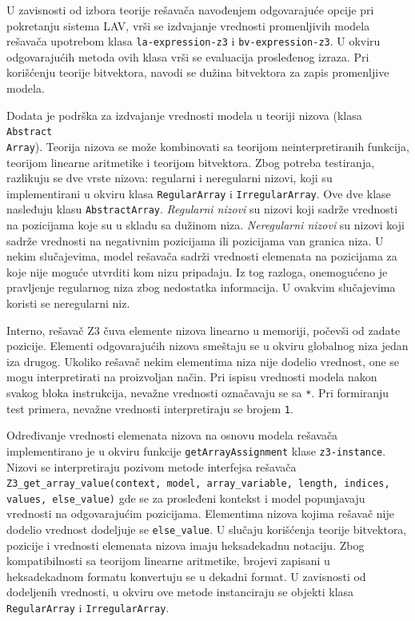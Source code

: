 \documentclass[12pt,oneside]{memoir}
\begin{document}
\par
U zavisnosti od izbora teorije rešavača navođenjem odgovarajuće opcije pri pokretanju sistema LAV, vrši se izdvajanje vrednosti promenljivih modela rešavača upotrebom klasa \texttt{la-expression-z3} i \texttt{bv-expression-z3}. U okviru odgovarajućih metoda ovih klasa vrši se evaluacija prosleđenog izraza. Pri korišćenju teorije bitvektora, navodi se dužina bitvektora za zapis promenljive modela.


Dodata je podrška za izdvajanje vrednosti modela u teoriji nizova (klasa \texttt{Abstract\\Array}). Teorija nizova se može kombinovati sa teorijom neinterpretiranih funkcija, teorijom linearne aritmetike i teorijom bitvektora.
Zbog potreba testiranja, razlikuju se dve vrste nizova: regularni i neregularni nizovi, koji su implementirani u okviru klasa \texttt{RegularArray} i \texttt{IrregularArray}. Ove dve klase nasleđuju klasu \texttt{AbstractArray}. \emph{Regularni nizovi} su nizovi koji sadrže vrednosti na pozicijama koje su u skladu sa dužinom niza. \emph{Neregularni nizovi} su nizovi koji sadrže vrednosti na negativnim pozicijama ili pozicijama van granica niza. U nekim slučajevima, model rešavača sadrži vrednosti elemenata na pozicijama za koje nije moguće utvrditi kom nizu pripadaju. Iz tog razloga, onemogućeno je pravljenje regularnog niza zbog nedostatka informacija. U ovakvim slučajevima koristi se neregularni niz.
\par
Interno, rešavač Z3 čuva elemente nizova linearno u memoriji, počevši od zadate pozicije. Elementi odgovarajućih nizova smeštaju se u okviru globalnog niza jedan iza drugog. Ukoliko rešavač nekim elementima niza nije dodelio vrednost, one se mogu interpretirati na proizvoljan način. Pri ispisu vrednosti modela nakon svakog bloka instrukcija, nevažne vrednosti označavaju se sa \texttt{*}. Pri formiranju test primera, nevažne vrednosti interpretiraju se brojem \texttt{1}.
\par
Određivanje vrednosti elemenata nizova na osnovu modela rešavača implementirano je u okviru funkcije \texttt{getArrayAssignment} klase \texttt{z3-instance}. Nizovi se interpretiraju pozivom metode interfejsa rešavača \texttt{Z3\_get\_array\_value(context, model, array\_variable, length, indices, values, else\_value)} gde se za prosleđeni kontekst i model popunjavaju vrednosti na odgovarajućim pozicijama. Elementima nizova kojima rešavač nije dodelio vrednost dodeljuje se \texttt{else\_value}. U slučaju korišćenja teorije bitvektora, pozicije i vrednosti elemenata nizova imaju heksadekadnu notaciju. Zbog kompatibilnosti sa teorijom linearne aritmetike, brojevi zapisani u heksadekadnom formatu konvertuju se u dekadni format. U zavisnosti od dodeljenih vrednosti, u okviru ove metode instanciraju se objekti klasa \texttt{RegularArray} i \texttt{IrregularArray}. 
\par
\end{document}
